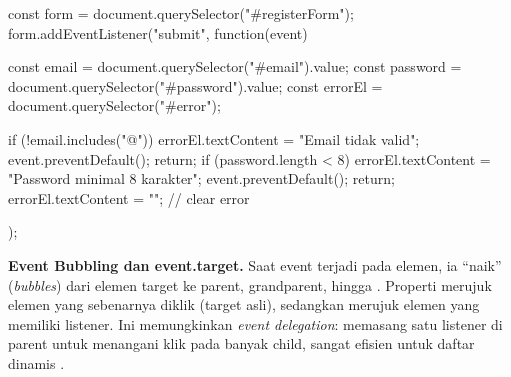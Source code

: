 \begin{webcode}[language=JavaScript, caption={Event listener dan validasi form}]
const form = document.querySelector("#registerForm");
form.addEventListener("submit", function(event) {
  const email = document.querySelector("#email").value;
  const password = document.querySelector("#password").value;
  const errorEl = document.querySelector("#error");

  if (!email.includes("@")) {
    errorEl.textContent = "Email tidak valid";
    event.preventDefault();
    return;
  }
  if (password.length < 8) {
    errorEl.textContent = "Password minimal 8 karakter";
    event.preventDefault();
    return;
  }
  errorEl.textContent = ""; // clear error
});
\end{webcode}

\begin{konsep}
\textbf{Event Bubbling dan event.target.} Saat event terjadi pada elemen, ia ``naik'' (\textit{bubbles}) dari elemen target ke parent, grandparent, hingga . Properti  merujuk elemen yang sebenarnya diklik (target asli), sedangkan  merujuk elemen yang memiliki listener. Ini memungkinkan \textit{event delegation}: memasang satu listener di parent untuk menangani klik pada banyak child, sangat efisien untuk daftar dinamis \cite{mdnJsGuide}.
\end{konsep}

